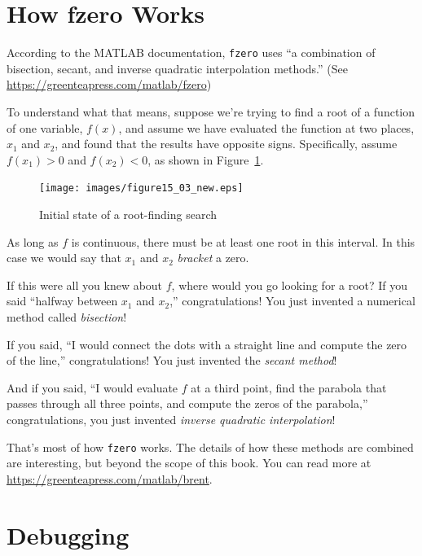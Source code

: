 \section{How fzero Works}
\label{howfzero}

According to the MATLAB documentation, \lstinline{fzero} uses ``a combination of bisection, secant, and inverse quadratic interpolation methods.''  (See \url{https://greenteapress.com/matlab/fzero})


To understand what that means, suppose we're trying to find a root of a function of one variable, $f(x)$, and assume we have evaluated the function at two places, $x_1$ and $x_2$, and found that the results have opposite signs.  Specifically, assume $f(x_1) > 0$ and $f(x_2) < 0$, as shown in Figure~\ref{fig:secant}.

\begin{figure}[h]
\centerline{\texttt{[image: images/figure15\_03\_new.eps]}}
\caption{Initial state of a root-finding search}
\label{fig:secant}
\end{figure}

As long as $f$ is continuous, there must be at least one root in this interval.
In this case we would say that $x_1$ and $x_2$ \emph{bracket} a zero.


If this were all you knew about $f$, where would you go looking for
a root?  If you said ``halfway between $x_1$ and $x_2$,''
congratulations!  You just invented a numerical method called
\emph{bisection}!

If you said, ``I would connect the dots with a straight line
and compute the zero of the line,''
congratulations!  You just invented the \emph{secant method}!

And if you said, ``I would evaluate $f$ at a third point, find the
parabola that passes through all three points, and compute the zeros
of the parabola,'' congratulations, you just invented
\emph{inverse quadratic interpolation}!

That's most of how \lstinline{fzero} works.  The details of how these methods are combined are interesting, but beyond the scope of this book.  You can read more at \url{https://greenteapress.com/matlab/brent}.




\section{Debugging}

